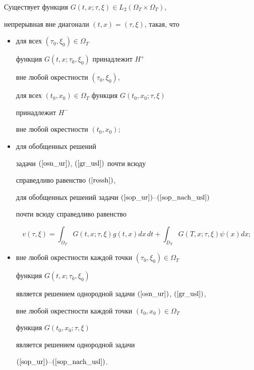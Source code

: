 \begin{prop}


Существует функция $G(t,x;\tau,\xi) \in L_2(\Omega_T\times\Omega_T)$,


непрерывная вне диагонали $(t,x)=(\tau,\xi)$, такая, что\\


\begin{itemize}


\item[а)] для всех $(\tau_0,\xi_0)\in \Omega_T$


функция $G(t,x;\tau_0,\xi_0)$ принадлежит $H^+$


вне любой окрестности $(\tau_0,\xi_0)$,


для всех $(t_0,x_0)\in \Omega_T$ функция $G(t_0,x_0;\tau,\xi)$


принадлежит $H^-$


вне любой окрестности $(t_0,x_0);$


\item[б)] для обобщенных решений 


задачи $(\ref{osn_ur})$, $(\ref{gr_usl})$ почти всюду


справедливо равенство $(\ref{ressh})$,


для обобщенных решений задачи $(\ref{sop_ur})$--$(\ref{sop_nach_usl})$ 


почти всюду справедливо равенство 


\begin{equation}


v(\tau,\xi)=\int_{\Omega_T}G(t,x;\tau,\xi)g(t,x)dx\,dt + 


\int_{D_T}G(T,x;\tau,\xi)\psi(x)dx;


\label{s_G_tozh} 


\end{equation}


\item[в)] вне любой окрестности каждой точки $(\tau_0,\xi_0)\in\Omega_T $ 


функция $G(t,x;\tau_0,\xi_0)$


является решением однородной задачи $(\ref{osn_ur})$, $(\ref{gr_usl})$,


вне любой окрестности каждой точки $(t_0,x_0)\in \Omega_T$ 


функция $G(t_0,x_0;\tau,\xi)$


является решением однородной задачи


$(\ref{sop_ur})$--$(\ref{sop_nach_usl})$.


\end{itemize}


\end{prop}





